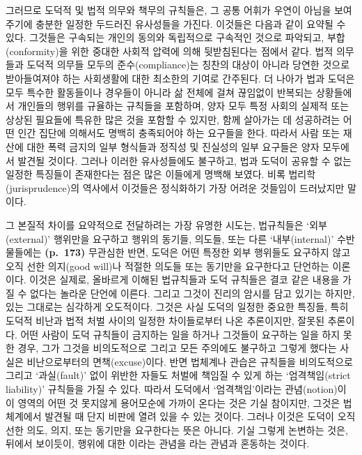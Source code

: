 그러므로 도덕적 및 법적 의무와 책무의 규칙들은, 그 공통 어휘가 우연이
아님을 보여주기에 충분한 일정한 두드러진 유사성들을 가진다. 이것들은
다음과 같이 요약될 수 있다. 그것들은 구속되는 개인의 동의와 독립적으로
구속적인 것으로 파악되고, 부합(conformity)을 위한 중대한 사회적 압력에
의해 뒷받침된다는 점에서 같다. 법적 의무들과 도덕적 의무들 모두의
준수(compliance)는 칭찬의 대상이 아니라 당연한 것으로 받아들여져야 하는
사회생활에 대한 최소한의 기여로 간주된다. 더 나아가 법과 도덕은 모두
특수한 활동들이나 경우들이 아니라 삶 전체에 걸쳐 끊임없이 반복되는
상황들에서 개인들의 행위를 규율하는 규칙들을 포함하며, 양자 모두 특정
사회의 실제적 또는 상상된 필요들에 특유한 많은 것을 포함할 수 있지만,
함께 살아가는 데 성공하려는 어떤 인간 집단에 의해서도 명백히 충족되어야
하는 요구들을 한다. 따라서 사람 또는 재산에 대한 폭력 금지의 일부
형식들과 정직성 및 진실성의 일부 요구들은 양자 모두에서 발견될 것이다.
그러나 이러한 유사성들에도 불구하고, 법과 도덕이 공유할 수 없는 일정한
특징들이 존재한다는 점은 많은 이들에게 명백해 보였다. 비록
법리학(jurisprudence)의 역사에서 이것들은 정식화하기 가장 어려운
것들임이 드러났지만 말이다.

그 본질적 차이를 요약적으로 전달하려는 가장 유명한 시도는, 법규칙들은
‘외부(external)’ 행위만을 요구하고 행위의 동기들, 의도들, 또는 다른
‘내부(internal)’ 수반물들에는 \textbf{(p.~173)} 무관심한 반면, 도덕은
어떤 특정한 외부 행위들도 요구하지 않고 오직 선한 의지(good will)나
적절한 의도들 또는 동기만을 요구한다고 단언하는 이론이다. 이것은 실제로,
올바르게 이해된 법규칙들과 도덕 규칙들은 결코 같은 내용을 가질 수 없다는
놀라운 단언에 이른다. 그리고 그것이 진리의 암시를 담고 있기는 하지만,
있는 그대로는 심각하게 오도적이다. 그것은 사실 도덕의 일정한 중요한
특징들, 특히 도덕적 비난과 법적 처벌 사이의 일정한 차이들로부터 나온
추론이지만, 잘못된 추론이다. 어떤 사람이 도덕 규칙들이 금지하는 일을
하거나 그것들이 요구하는 일을 하지 못한 경우, 그가 그것을 비의도적으로
그리고 모든 주의에도 불구하고 그렇게 했다는 사실은 
비난으로부터의 면책(excuse)이다. 반면 법체계나 관습은 규칙들을
비의도적으로 그리고 ‘과실(fault)’ 없이 위반한 자들도 처벌에 책임질 수
있게 하는 ‘엄격책임(strict liability)’ 규칙들을 가질 수 있다. 따라서
도덕에서 ‘엄격책임’이라는 관념(notion)이 이 영역의 어떤 것 못지않게
용어모순에 가까이 온다는 것은 기실 참이지만, 그것은 법체계에서 발견될 때
단지 비판에 열려 있을 수 있는 것이다. 그러나 이것은 도덕이 오직 선한
의도, 의지, 또는 동기만을 요구한다는 뜻은 아니다. 기실 그렇게 논변하는
것은, 뒤에서 보이듯이, 행위에 대한 이라는 관념을
라는 관념과 혼동하는 것이다.

